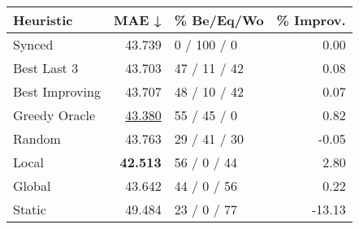 \begin{tabular}{lrlr}
\toprule
\textbf{Heuristic} & \textbf{MAE ↓} & \textbf{\% Be/Eq/Wo} & \textbf{\% Improv.} \\
\midrule
            Synced &         43.739 &          0 / 100 / 0 &                0.00 \\
\midrule
       Best Last 3 &         43.703 &         47 / 11 / 42 &                0.08 \\
    Best Improving &         43.707 &         48 / 10 / 42 &                0.07 \\
\addlinespace
     Greedy Oracle &         \underline{43.380} &          55 / 45 / 0 &                0.82 \\
            Random &         43.763 &         29 / 41 / 30 &               -0.05 \\
\midrule
             Local &         \textbf{42.513} &          56 / 0 / 44 &                2.80 \\
            Global &         43.642 &          44 / 0 / 56 &                0.22 \\
\midrule
            Static &         49.484 &          23 / 0 / 77 &              -13.13 \\
\bottomrule
\end{tabular}

\label{tab:iid_lr01_le2_bs2_Summary}
